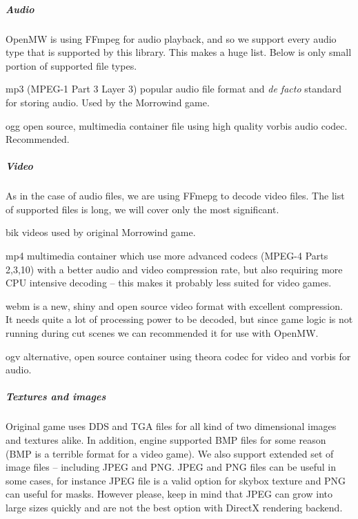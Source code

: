 \subparagraph{Audio}
Open{MW} is using {FF}mpeg for audio playback, and so we support every audio type that is supported by this library. This makes a huge list.
Below is only small portion of supported file types.

\begin{description}
 \item mp3 (MPEG-1 Part 3 Layer 3) popular audio file format and \textit{de facto} standard for storing audio. Used by the Morrowind game.
 \item ogg open source, multimedia container file using high quality vorbis audio codec. Recommended.
\end{description}

\subparagraph{Video}
As in the case of audio files, we are using {FFmepg} to decode video files. The list of supported files is long, we will cover
only the most significant.

\begin{description}
 \item bik videos used by original Morrowind game.
 \item mp4 multimedia container which use more advanced codecs (MPEG-4 Parts 2,3,10) with a better audio and video compression rate,
 but also requiring more {CPU} intensive decoding -- this makes it probably less suited for video games.
 \item webm is a new, shiny and open source video format with excellent compression. It needs quite a lot of processing power to be decoded,
 but since game logic is not running during cut scenes we can recommended it for use with Open{MW}.
 \item ogv alternative, open source container using theora codec for video and vorbis for audio.
\end{description}

\subparagraph{Textures and images}
Original \MW game uses DDS and TGA files for all kind of two dimensional images and textures alike. In addition, engine supported BMP
files for some reason (BMP is a terrible format for a video game). We also support extended set of image files -- including JPEG and PNG.
JPEG and PNG files can be useful in some cases, for instance JPEG file is a valid option for skybox texture and PNG can useful for masks.
However please, keep in mind that JPEG can grow into large sizes quickly and are not the best option with DirectX rendering backend.

